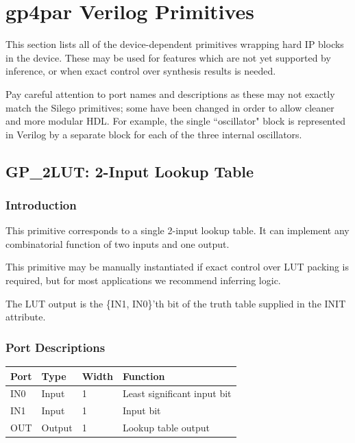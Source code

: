 \documentclass{article}
\begin{document}
\pagebreak
\section{gp4par Verilog Primitives}

This section lists all of the device-dependent primitives wrapping hard IP blocks in the device. These may be used for 
features which are not yet supported by inference, or when exact control over synthesis results is needed.

Pay careful attention to port names and descriptions as these may not exactly match the Silego primitives; some have 
been changed in order to allow cleaner and more modular HDL. For example, the single ``oscillator" block is represented 
in Verilog by a separate block for each of the three internal oscillators.


\pagebreak
\subsection{GP\_2LUT: 2-Input Lookup Table}

\subsubsection{Introduction}
This primitive corresponds to a single 2-input lookup table. It can implement any combinatorial function of two 
inputs and one output.

This primitive may be manually instantiated if exact control over LUT packing is required, but for most applications we 
recommend inferring logic.

The LUT output is the \{IN1, IN0\}'th bit of the truth table supplied in the INIT attribute.

\subsubsection{Port Descriptions}

\begin{tabularx}{4in}{|l|l|l|X|}
\hline
{\bfseries Port} & {\bfseries Type} & {\bfseries Width} & {\bfseries Function} \\
\hline
IN0 & Input & 1 & Least significant input bit \\
\hline
IN1 & Input & 1 & Input bit \\
\hline
OUT & Output & 1 & Lookup table output \\
\hline
\end{tabularx}
\end{document}
